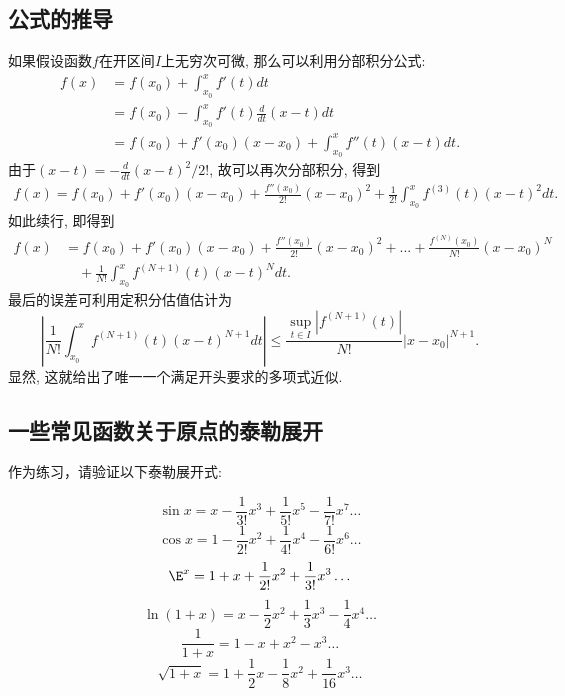 \subsection{公式的推导}
如果假设函数$f$在开区间$I$上无穷次可微, 那么可以利用分部积分公式:
\begin{equation}
\begin{aligned}
f(x)
&=f(x_0)+\int_{x_0}^{x}f'(t)dt\\
&=f(x_0)-\int_{x_0}^{x}f'(t)\frac{d}{dt}(x-t)dt\\
&=f(x_0)+f'(x_0)(x-x_0)+\int_{x_0}^{x}f''(t)(x-t)dt.
\end{aligned}
\end{equation}
由于$(x-t)=-\frac{d}{dt}(x-t)^2/2!$, 故可以再次分部积分, 得到
\begin{equation}
\begin{aligned}
f(x)
=f(x_0)+f'(x_0)(x-x_0)+\frac{f''(x_0)}{2!}(x-x_0)^2
+\frac{1}{2!}\int_{x_0}^{x}f^{(3)}(t)(x-t)^2dt.
\end{aligned}
\end{equation}
如此续行, 即得到
\begin{equation}
\begin{aligned}
f(x)
&=f(x_0)+f'(x_0)(x-x_0)+\frac{f''(x_0)}{2!}(x-x_0)^2+...+\frac{f^{(N)}(x_0)}{N!}(x-x_0)^N\\
&\quad+\frac{1}{N!}\int_{x_0}^{x}f^{(N+1)}(t)(x-t)^{N}dt.
\end{aligned}
\end{equation}
最后的误差可利用定积分估值估计为
\begin{equation}\label{Taylor_eq7}
\left|\frac{1}{N!}\int_{x_0}^{x}f^{(N+1)}(t)(x-t)^{N+1}dt\right|
\leq\frac{\sup_{t\in I}|f^{(N+1)}(t)|}{N!}|x-x_0|^{N+1}.
\end{equation}
显然, 这就给出了唯一一个满足开头要求的多项式近似.

\subsection{一些常见函数关于原点的泰勒展开}
作为练习，请验证以下泰勒展开式:

\begin{equation}
\sin x = x - \frac{1}{3!} x^3 + \frac{1}{5!} x^5 - \frac{1}{7!} x^7 \ldots
\end{equation}
\begin{equation}
\cos x = 1 - \frac{1}{2!} x^2 + \frac{1}{4!} x^4 -\frac{1}{6!} x^6 \ldots
\end{equation}
\begin{equation}\label{Taylor_eq11}
\E^x =1 + x + \frac{1}{2!} x^2 + \frac{1}{3!} x^3  \ldots
\end{equation}
\begin{equation}
\ln (1+x) = x - \frac12 x^2 + \frac13 x^3 - \frac14 x^4 \ldots
\end{equation}
\begin{equation}
\frac{1}{1+x} = 1 - x + x^2 - x^3 \ldots
\end{equation}
\begin{equation}
\sqrt{1+x} = 1 + \frac12 x - \frac18 x^2 + \frac{1}{16} x^3 \ldots
\end{equation}

